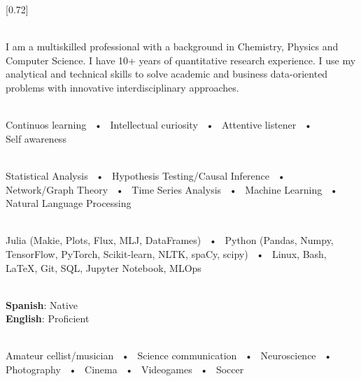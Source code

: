 \documentclass[lighthipster]{simplehipstercv}
\begin{document}
\setlength{\columnsep}{.5cm}
[0.72]
\begin{paracol}{2}

\paracolbackgroundoptions



\footnotesize
{\setasidefontcolour
\flushright

\\[0.5em]
I am a multiskilled professional with a background in Chemistry, Physics and Computer Science. I have 10+ years of quantitative research experience. I use my analytical and technical skills to solve academic and business data-oriented problems with innovative interdisciplinary approaches. 
\bigskip
\vspace{6em}

 \\[0.5em]

 Continuos learning ~•~ Intellectual curiosity  ~•~  Attentive listener ~•~\\ Self awareness 

\bigskip

 \\[0.5em]

Statistical Analysis ~•~ Hypothesis Testing/Causal Inference ~•~ Network/Graph Theory ~•~ Time Series Analysis ~•~ Machine Learning ~•~ Natural Language Processing
\bigskip

\\[0.5em]
Julia (Makie, Plots, Flux, MLJ, DataFrames) ~•~ Python (Pandas, Numpy, TensorFlow, PyTorch, Scikit-learn, NLTK, spaCy, scipy) ~•~ Linux, Bash, LaTeX, Git, SQL, Jupyter Notebook, MLOps
\vspace{4em}

\bigskip

\\[0.5em]
{\bf Spanish}: Native\\
{\bf English}: Proficient
\vspace{4em}


\bigskip

\\[0.5em]
Amateur cellist/musician ~•~ Science communication ~•~ Neuroscience  ~•~ Photography ~•~ Cinema ~•~ Videogames ~•~ Soccer
\vspace{10em}

}
\end{paracol}
\end{document}
